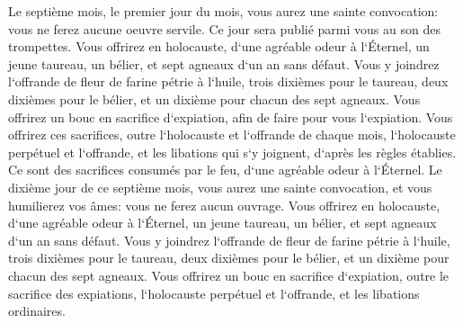 \verse Le septième mois, le premier jour du mois, vous aurez une sainte convocation: vous ne ferez aucune oeuvre servile. Ce jour sera publié parmi vous au son des trompettes. 
\verse Vous offrirez en holocauste, d`une agréable odeur à l`Éternel, un jeune taureau, un bélier, et sept agneaux d`un an sans défaut. 
\verse Vous y joindrez l`offrande de fleur de farine pétrie à l`huile, trois dixièmes pour le taureau, deux dixièmes pour le bélier, 
\verse et un dixième pour chacun des sept agneaux. 
\verse Vous offrirez un bouc en sacrifice d`expiation, afin de faire pour vous l`expiation. 
\verse Vous offrirez ces sacrifices, outre l`holocauste et l`offrande de chaque mois, l`holocauste perpétuel et l`offrande, et les libations qui s`y joignent, d`après les règles établies. Ce sont des sacrifices consumés par le feu, d`une agréable odeur à l`Éternel. 
\verse Le dixième jour de ce septième mois, vous aurez une sainte convocation, et vous humilierez vos âmes: vous ne ferez aucun ouvrage. 
\verse Vous offrirez en holocauste, d`une agréable odeur à l`Éternel, un jeune taureau, un bélier, et sept agneaux d`un an sans défaut. 
\verse Vous y joindrez l`offrande de fleur de farine pétrie à l`huile, trois dixièmes pour le taureau, 
\verse deux dixièmes pour le bélier, et un dixième pour chacun des sept agneaux. 
\verse Vous offrirez un bouc en sacrifice d`expiation, outre le sacrifice des expiations, l`holocauste perpétuel et l`offrande, et les libations ordinaires. 
